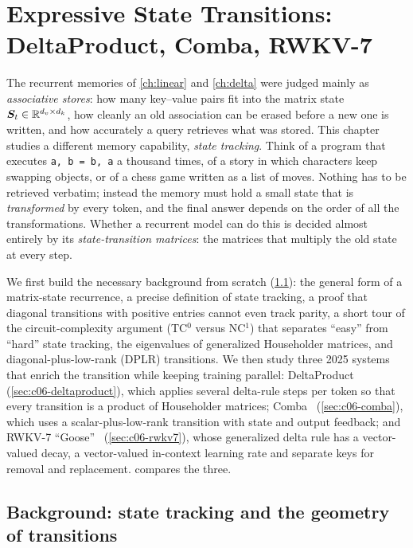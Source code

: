 \chapter{Expressive State Transitions: DeltaProduct, Comba, RWKV-7}\label{ch:expressive}

The recurrent memories of \cref{ch:linear} and \cref{ch:delta} were judged mainly as
\emph{associative stores}: how many key--value pairs fit into the matrix state
$\bm{S}_t\in\mathbb{R}^{d_v\times d_k}$, how cleanly an old association can be erased before a new one
is written, and how accurately a query retrieves what was stored. This chapter studies a
different memory capability, \emph{state tracking}. Think of a program that executes
\texttt{a, b = b, a} a thousand times, of a story in which characters keep swapping
objects, or of a chess game written as a list of moves. Nothing has to be retrieved
verbatim; instead the memory must hold a small state that is \emph{transformed} by every
token, and the final answer depends on the order of all the transformations. Whether a
recurrent model can do this is decided almost entirely by its \emph{state-transition
matrices}: the matrices that multiply the old state at every step.

We first build the necessary background from scratch
(\cref{sec:c06-background}): the general form of a matrix-state recurrence, a precise
definition of state tracking, a proof that diagonal transitions with positive entries cannot
even track parity, a short tour of the circuit-complexity argument (TC$^0$ versus NC$^1$)
that separates ``easy'' from ``hard'' state tracking, the eigenvalues of generalized
Householder matrices, and diagonal-plus-low-rank (DPLR) transitions. We then study three
2025 systems that enrich the transition while keeping training parallel:
DeltaProduct~\citep{siems2025deltaproduct} (\cref{sec:c06-deltaproduct}), which applies
several delta-rule steps per token so that every transition is a product of Householder
matrices; Comba~\citep{hu2025comba} (\cref{sec:c06-comba}), which uses a
scalar-plus-low-rank transition with state and output feedback; and RWKV-7
``Goose''~\citep{peng2025rwkv7} (\cref{sec:c06-rwkv7}), whose generalized delta rule has a
vector-valued decay, a vector-valued in-context learning rate and separate keys for removal
and replacement.  compares the three.

\section{Background: state tracking and the geometry of transitions}\label{sec:c06-background}

